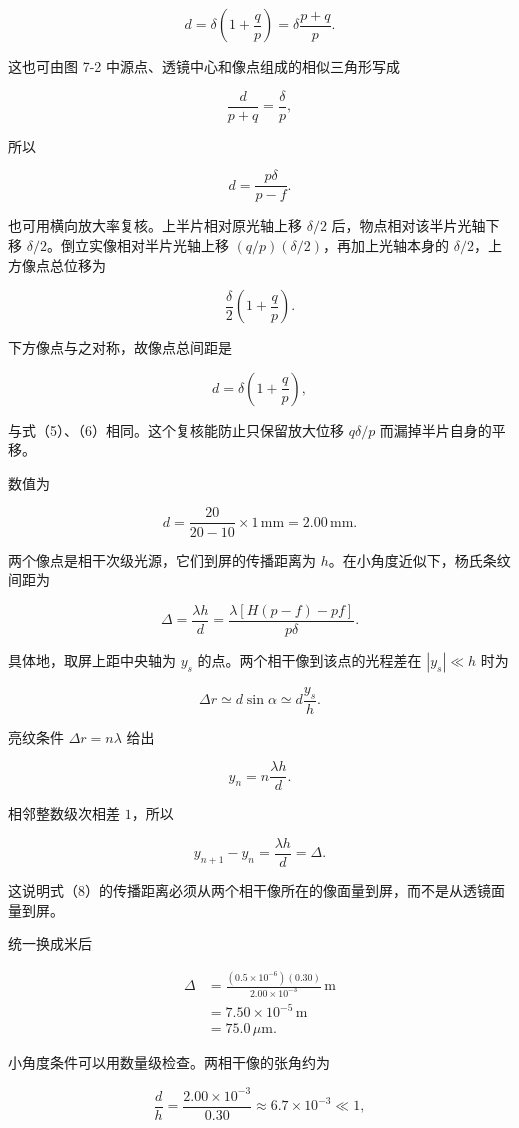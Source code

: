 \documentclass[12pt,a4paper,UTF8]{ctexart}
\begin{document}
\[
d=\delta\left(1+\frac qp\right)
=\delta\frac{p+q}{p}.
\]

这也可由图 7-2 中源点、透镜中心和像点组成的相似三角形写成

\[
\frac{d}{p+q}=\frac{\delta}{p},
\tag{5}
\]

所以

\[
d=\frac{p\delta}{p-f}.
\tag{6}
\]

也可用横向放大率复核。上半片相对原光轴上移 \(\delta/2\)
后，物点相对该半片光轴下移 \(\delta/2\)。倒立实像相对半片光轴上移
\((q/p)(\delta/2)\)，再加上光轴本身的 \(\delta/2\)，上方像点总位移为

\[
\frac\delta2\left(1+\frac qp\right).
\]

下方像点与之对称，故像点总间距是

\[
d=\delta\left(1+\frac qp\right),
\]

与式（5）、（6）相同。这个复核能防止只保留放大位移 \(q\delta/p\)
而漏掉半片自身的平移。

数值为

\[
d=\frac{20}{20-10}\times1\,\mathrm{mm}
=2.00\,\mathrm{mm}.
\tag{7}
\]

两个像点是相干次级光源，它们到屏的传播距离为
\(h\)。在小角度近似下，杨氏条纹间距为

\[
\Delta=\frac{\lambda h}{d}
=\frac{\lambda[H(p-f)-pf]}{p\delta}.
\tag{8}
\]

具体地，取屏上距中央轴为 \(y_s\) 的点。两个相干像到该点的光程差在
\(|y_s|\ll h\) 时为

\[
\Delta r\simeq d\sin\alpha
\simeq d\frac{y_s}{h}.
\]

亮纹条件 \(\Delta r=n\lambda\) 给出

\[
y_n=n\frac{\lambda h}{d}.
\]

相邻整数级次相差 \(1\)，所以

\[
y_{n+1}-y_n=\frac{\lambda h}{d}=\Delta.
\]

这说明式（8）的传播距离必须从两个相干像所在的像面量到屏，而不是从透镜面量到屏。

统一换成米后

\[
\begin{aligned}
\Delta
&=\frac{(0.5\times10^{-6})(0.30)}{2.00\times10^{-3}}\,\mathrm m\\
&=7.50\times10^{-5}\,\mathrm m\\
&=75.0\,\mu\mathrm m.
\end{aligned}
\tag{9}
\]

小角度条件可以用数量级检查。两相干像的张角约为

\[
\frac dh=\frac{2.00\times10^{-3}}{0.30}
\approx6.7\times10^{-3}\ll1,
\]
\end{document}
